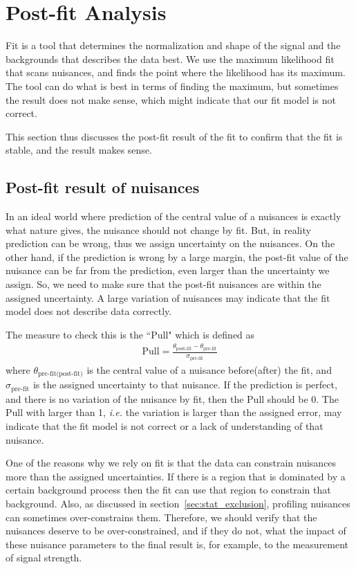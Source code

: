 \section{Post-fit Analysis}
\label{sec:post-fit-ana}

Fit is a tool that determines the normalization and shape of the 
signal and the backgrounds that describes the data best. 
We use the maximum likelihood fit that scans nuisances, and finds 
the point where the likelihood has its maximum. The tool 
can do what is best in terms of finding the maximum, but 
sometimes the result does not make sense, which might 
indicate that our fit model is not correct. 

This section thus discusses the post-fit result of the fit 
to confirm that the fit is stable, and the result makes sense. 

\subsection{Post-fit result of nuisances}

In an ideal world where prediction of the central value of a nuisances is 
exactly what nature gives, the nuisance should not change by fit. But, in reality 
prediction can be wrong, thus we assign uncertainty on the nuisances. On the other 
hand, if the prediction is wrong by a large margin, the post-fit value of the nuisance 
can be far from the prediction, even larger than the uncertainty we assign. 
So, we need to make sure that the post-fit nuisances are within the assigned uncertainty.
A large variation of nuisances may indicate that the fit model does not 
describe data correctly. 

The measure to check this is the ``Pull" which is defined as 
\begin{eqnarray} 
\textrm{Pull} = \frac{\theta_{\textrm{post-fit}} - \theta_{\textrm{pre-fit}}}{\sigma_{\textrm{pre-fit}}}  
\end{eqnarray} 
where $\theta_{\textrm{pre-fit(post-fit)}}$ is the central value of a nuisance 
before(after) the fit, and $\sigma_{\textrm{pre-fit}}$ is the assigned uncertainty 
to that nuisance. If the prediction is perfect, and there is no variation of 
the nuisance by fit, then the Pull should be 0. The Pull with larger than 1, 
\textit{i.e.} the variation is larger than the assigned error, may indicate 
that the fit model is not correct or a lack of understanding of that nuisance. 

One of the reasons why we rely on fit is that the data can constrain nuisances 
more than the assigned uncertainties. If there is a region that is dominated by 
a certain background process then the fit can use that region to constrain that 
background. Also, as discussed in section~\ref{sec:stat_exclusion}, profiling 
nuisances can sometimes over-constrains them. Therefore, we should verify  
that the nuisances deserve to be over-constrained, and if they do not, what the 
impact of these nuisance parameters to the final result is, for example, 
to the measurement of signal strength. 

